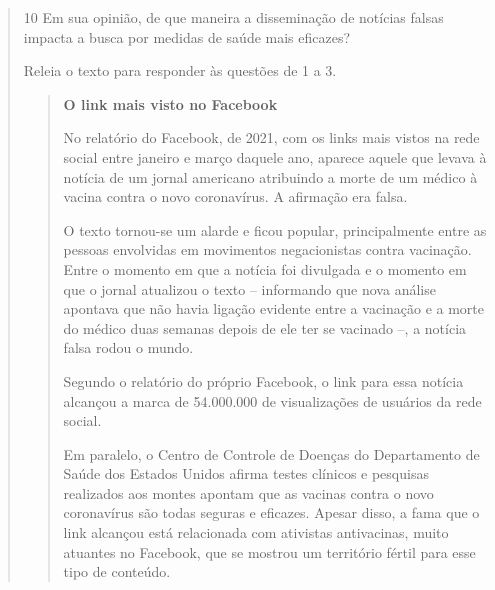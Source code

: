 \begin{quote}


\num{10} Em sua opinião, de que maneira a disseminação de notícias falsas
impacta a busca por medidas de saúde mais eficazes?



Releia o texto para responder às questões de 1 a 3.

\begin{quote}
\textbf{O link mais visto no Facebook}

No relatório do Facebook, de 2021, com os links mais vistos na rede social
entre janeiro e março daquele ano, aparece aquele que levava à notícia
de um jornal americano atribuindo a morte de um médico à vacina contra
o novo coronavírus. A afirmação era falsa.

O texto tornou-se um alarde e ficou popular, principalmente entre as pessoas
envolvidas em movimentos negacionistas contra vacinação. Entre o momento em
que a notícia foi divulgada e o momento em que o jornal atualizou o texto --
informando que nova análise apontava que não havia ligação evidente entre a
vacinação e a morte do médico duas semanas depois de ele ter se vacinado --,
a notícia falsa rodou o mundo.

Segundo o relatório do próprio Facebook, o link para essa notícia alcançou
a marca de 54.000.000 de visualizações de usuários da rede social.


Em paralelo, o Centro de Controle de Doenças do Departamento de Saúde dos Estados
Unidos afirma testes clínicos e pesquisas realizados aos montes apontam que as
vacinas contra o novo coronavírus são todas seguras e eficazes. Apesar disso, a
fama que o link alcançou está relacionada com ativistas antivacinas, muito atuantes
no Facebook, que se mostrou um território fértil para esse tipo de conteúdo.


\end{quote}
\end{quote}
